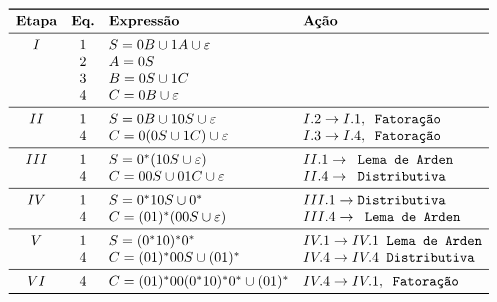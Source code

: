 \documentclass[12pt]{article}
\newcommand{\ve}{\ensuremath{\varepsilon}}
\begin{document}
\begin{tcolorbox}[breakable,rounded corners, colback=yellow!5, colframe=red!40!black, title={Extração de expressão regular $\mathcal{R}_1$ da gramática $G$, tal que $\mathcal{L}(\mathcal{R}_1)=\mathcal{L}(G_1)$}]
  $$
  \begin{array}{ccll}
  \toprule
  \textbf{Etapa} & \textbf{Eq.} & \textbf{Expressão} & \textbf{Ação}\\
  \midrule
    I & 1 & S = 0B \cup 1A \cup \ve    &\\
      & 2 & A = 0S                     &\\
      & 3 & B = 0S \cup 1C             &\\
      & 4 & C = 0B \cup \ve            &\\
  \midrule
   II & 1 & S = 0B \cup 10S \cup \ve   & I.2 \to I.1,\texttt{ Fatoração}\\
      & 4 & C = 0(0S \cup 1C) \cup \ve & I.3 \to I.4, \texttt{ Fatoração}\\
  \midrule
  III & 1 & S = 0^*(10S \cup \ve)      & II.1 \to \texttt{ Lema de Arden}\\
      & 4 & C = 00S\cup 01C \cup \ve   & II.4 \to \texttt{ Distributiva}\\
  \midrule
   IV & 1 & S = 0^*10S \cup 0^*        & III.1 \to \texttt{Distributiva}\\
      & 4 & C = (01)^*(00S \cup \ve)   & III.4 \to \texttt{ Lema de Arden}\\
  \midrule
    V & 1 & S = (0^*10)^*0^*           & IV.1 \to IV.1 \texttt{ Lema de Arden} \\
      & 4 & C = (01)^*00S \cup (01)^*  & IV.4 \to IV.4 \texttt{ Distributiva} \\
  \midrule
   VI & 4 & C = (01)^*00(0^*10)^*0^* \cup (01)^*  & IV.4 \to IV.1,  \texttt{ Fatoração} \\
  \bottomrule
  \end{array}
  $$
\end{tcolorbox}\bigskip
\end{document}
